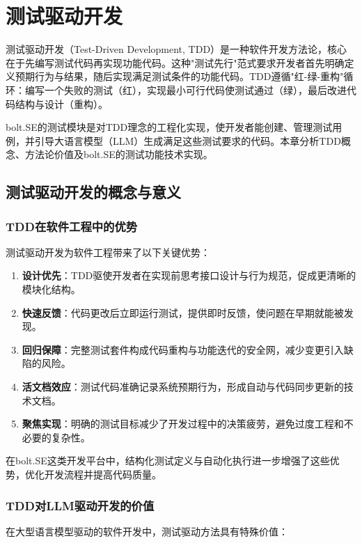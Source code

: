 
\chapter{测试驱动开发}
\label{chap:tdd}

测试驱动开发（Test-Driven Development, TDD）是一种软件开发方法论，核心在于先编写测试代码再实现功能代码。这种"测试先行"范式要求开发者首先明确定义预期行为与结果，随后实现满足测试条件的功能代码。TDD遵循"红-绿-重构"循环：编写一个失败的测试（红），实现最小可行代码使测试通过（绿），最后改进代码结构与设计（重构）。

bolt.SE的测试模块是对TDD理念的工程化实现，使开发者能创建、管理测试用例，并引导大语言模型（LLM）生成满足这些测试要求的代码。本章分析TDD概念、方法论价值及bolt.SE的测试功能技术实现。

\section{测试驱动开发的概念与意义}

\subsection{TDD在软件工程中的优势}
测试驱动开发为软件工程带来了以下关键优势：

\begin{enumerate}
  \item \textbf{设计优先}：TDD驱使开发者在实现前思考接口设计与行为规范，促成更清晰的模块化结构。
  
  \item \textbf{快速反馈}：代码更改后立即运行测试，提供即时反馈，使问题在早期就能被发现。
  
  \item \textbf{回归保障}：完整测试套件构成代码重构与功能迭代的安全网，减少变更引入缺陷的风险。
  
  \item \textbf{活文档效应}：测试代码准确记录系统预期行为，形成自动与代码同步更新的技术文档。
  
  \item \textbf{聚焦实现}：明确的测试目标减少了开发过程中的决策疲劳，避免过度工程和不必要的复杂性。
\end{enumerate}

在bolt.SE这类开发平台中，结构化测试定义与自动化执行进一步增强了这些优势，优化开发流程并提高代码质量。

\subsection{TDD对LLM驱动开发的价值}
在大型语言模型驱动的软件开发中，测试驱动方法具有特殊价值\cite{Mathews2024}：

